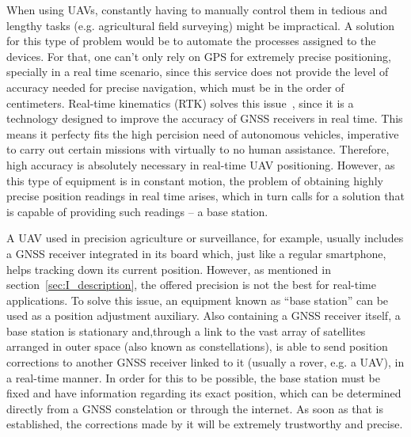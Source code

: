 When using UAVs, constantly having to manually control them in tedious and lengthy tasks (e.g. agricultural field surveying) might be impractical.
A solution for this type of problem would be to automate the processes assigned to the devices. For that, one can't only rely on GPS for extremely precise positioning, specially in a real time scenario, since this service does not provide the level of accuracy needed for precise navigation, which must be in the order of centimeters. Real-time kinematics (RTK) solves this issue~\cite{gps_USGov,8714161},
since it is a technology designed to improve the accuracy of GNSS receivers in real time. This means it perfecty fits the high percision need of autonomous vehicles, imperative to carry out certain missions with virtually to no human assistance. Therefore, high accuracy is absolutely necessary in real-time UAV positioning.
However, as this type of equipment is in constant motion, the problem of obtaining highly precise position readings in real time arises, which in turn calls for a solution that is capable of providing such readings -- a base station.

A UAV used in precision agriculture or surveillance, for example, usually includes a GNSS receiver integrated in its board which, just like a regular smartphone, helps tracking down its current position. However, as mentioned in section~\ref{sec:I_description}, the offered
precision is not the best for real-time applications. To solve this issue, an equipment known as ``base station'' can be used as a position adjustment auxiliary.
Also containing a GNSS receiver itself, a base station is stationary and,through a link to the vast array of satellites arranged in outer space (also known as constellations), is able to send position corrections to another GNSS receiver linked to it (usually a rover, e.g. a UAV), in a real-time manner.
In order for this to be possible, the base station must be fixed and have information regarding its exact position, which can be determined directly from a GNSS constelation or through the internet.
As soon as that is established, the corrections made by it will be extremely trustworthy and precise.

